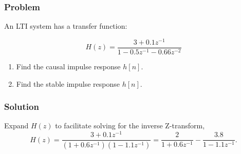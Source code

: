 
\subsubsection{Problem}
An LTI system has a transfer function: 

\begin{equation}
    H(z) = \frac{3 + 0.1 z^{-1}}{1-0.5z^{-1} -0.66 z^{-2}}
\end{equation}

\begin{enumerate}
    \item Find the causal impulse response $h[n]$.
    \item Find the stable impulse response $h[n]$.
\end{enumerate}

\subsubsection{Solution}

Expand $H(z)$ to facilitate solving for the inverse Z-transform, 
\begin{equation}
    H(z) = \frac{{3 + 0.1{z^{ - 1}}}}{{\left( {1 + 0.6{z^{ - 1}}} \right)\left( {1 - 1.1{z^{ - 1}}} \right)}} = \frac{2}{{1 + 0.6{z^{ - 1}}}} - \frac{{3.8}}{{1 - 1.1{z^{ - 1}}}}.
\end{equation}

